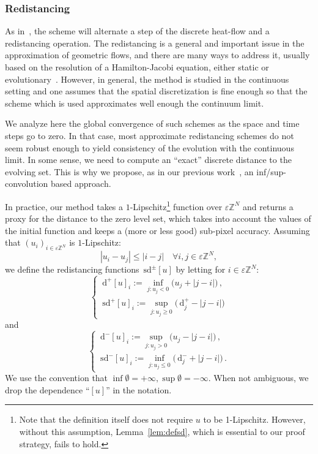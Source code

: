 \documentclass[10pt]{amsart}
\theoremstyle{plain}
\theoremstyle{definition}
\newcommand{\Z}{\mathbb{Z}}
\newcommand{\e}{\varepsilon}
\newcommand{\ud}{\,\mathrm{d}}
\newcommand{\sd}{\,\mathrm{sd}}
\newcommand{\ez}{\e\Z^N}
\numberwithin{equation}{section}
\begin{document}
\subsubsection*{Redistancing}
As in~\cite{EsedogluRuuthTsai10}, the scheme will alternate a step of the discrete heat-flow and a redistancing operation. The redistancing is a general and important
issue in the approximation of geometric flows, and there are many ways to
address it, usually based on the resolution of a Hamilton-Jacobi equation,
either static or evolutionary~\cite{RouyTourin,HamamukiNtovoris16}.
However, in general, the method is studied in the continuous
setting and one assumes that the spatial discretization is
fine enough so that the scheme which is used approximates
well enough the continuum limit.

We analyze here the global convergence of such schemes as the
space and time steps go to zero. In that case, most approximate
redistancing schemes  {do} not seem robust enough to yield 
consistency of the evolution with the continuous limit.
In some sense, we need to compute an ``exact'' discrete
distance to the evolving set.
This is why we propose, as in our previous work~\cite{CDGM-crystal}, an inf/sup-convolution
based approach.

In practice, our method takes a $1$-Lipschitz\footnote{ 
Note that the definition itself does not require $u$ to be 1-Lipschitz. However, without this assumption, Lemma~\ref{lem:defsd}, which is essential to our proof strategy, fails to hold.} function over $\ez$ and returns a proxy for
the distance to the zero level set, which takes into account the values of the initial function and  
keeps a (more or less good) sub-pixel accuracy.
Assuming that $(u_i)_{i\in \ez}$ is $1$-Lipschitz:
\[
  |u_i-u_j|\le |i-j|\quad\forall i,j\in\ez,
\]
 we define the redistancing functions $\sd^\pm[u]$ by letting for $i\in\ez$:
\begin{equation}\label{eq:sdp}
  \begin{cases}
    \ud^+[u]_i := \inf_{j:u_j<0}  {(} u_j + |j-i| {)}\,,\\
    \sd^+[u]_i := \sup_{j:u_j\ge 0}  {(} \ud^+_j - |j-i|  {)}
  \end{cases}
\end{equation}
and
\begin{equation}\label{eq:sdm}
  \begin{cases}
    \ud^-[u]_i := \sup_{j:u_j>0}  {(}u_j - |j-i| {)}\,,\\
    \sd^-[u]_i := \inf_{j:u_j\le 0}  {(} \ud^-_j + |j-i| {)}\,.
  \end{cases}
\end{equation}
 {We use  the convention that $\inf \emptyset=+\infty, \sup \emptyset=-\infty$.}
When not ambiguous, we drop the dependence ``$[u]$'' in the notation.
\end{document}
